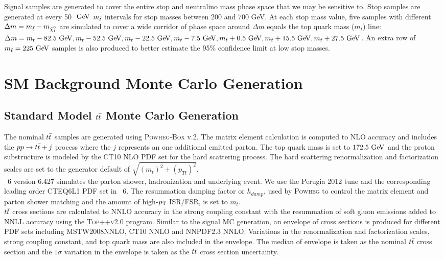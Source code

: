 \indent Signal samples are generated to cover the entire stop and neutralino mass phase space that we may be sensitive to.  Stop samples are generated at every 50 $\gev$ $m_{\tilde{t}}$ intervals for stop masses between 200 and 700 GeV.  At each stop mass value, five samples with different ${\Delta}m = m_{\stop} - m_{\ninoone}$ are simulated to cover a wide corridor of phase space around ${\Delta}m$ equals the top quark mass ($m_{t}$) line: ${\Delta}m = m_{t} - 82.5 \gev, m_{t} - 52.5 \gev, m_{t} - 22.5 \gev, m_{t} - 7.5 \gev, m_{t}+0.5 \gev,  m_{t}+15.5 \gev, m_{t}+27.5 \gev$.  An extra row of $m_{\stop} = 225 \gev$ samples is also produced to better estimate the 95\% confidence limit at low stop masses. \\

\section{SM Background Monte Carlo Generation}
\label{sec:MC:Bkg}

\subsection{Standard Model $t\bar{t}$ Monte Carlo Generation}

\indent The nominal $t\bar{t}$ samples are generated using \textsc{Powheg-Box} v.2.\cite{PowhegTTbar}  The matrix element calculation is computed to NLO accuracy and includes the $pp \rightarrow t\bar{t} + j$ process where the $j$ represents an one additional emitted parton.  The top quark mass is set to $172.5 \gev$ and the proton substructure is modeled by the CT10 NLO PDF set \cite{CT10} for the hard scattering process.  The hard scattering renormalization and factorization scales are set to the generator default of $\sqrt{(m_{t})^2 + (p_{T t})^2}$.  \\

\indent \pythia~6 version 6.427 simulates the parton shower, hadronization and underlying event.\cite{Pythia6}  We use the Perugia 2012 tune \cite{Perugia2012} and the corresponding leading order CTEQ6L1 PDF set \cite{CTEQ6L1} in \pythia~6.  The resummation damping factor or $h_{damp}$, used by \textsc{Powheg} to control the matrix element and parton shower matching and the amount of high-$p_{\mathrm{T}}$ ISR/FSR, is set to $m_{t}$. \\

\indent $t\bar{t}$ cross sections are calculated to NNLO accuracy in the strong coupling constant with the resummation of soft gluon emissions added to NNLL accuracy using the \textsc{Top++v2.0} program.\cite{topXsec}  Similar to the signal MC generation, an envelope of cross sections is produced for different PDF sets including MSTW2008NNLO, CT10 NNLO and NNPDF2.3 NNLO.  Variations in the renormalization and factorization scales, strong coupling constant, and top quark mass are also included in the envelope.  The median of envelope is taken as the nominal $t\bar{t}$ cross section and the $1\sigma$ variation in the envelope is taken as the $t\bar{t}$ cross section uncertainty.  \\

